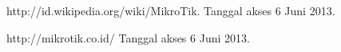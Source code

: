\documentclass{jtetiproposalskripsi}
\begin{document}

\begin{thebibliography}{9}

http://id.wikipedia.org/wiki/MikroTik. Tanggal akses 6 Juni 2013.

http://mikrotik.co.id/ Tanggal akses 6 Juni 2013.



\end{thebibliography}
\end{document}
